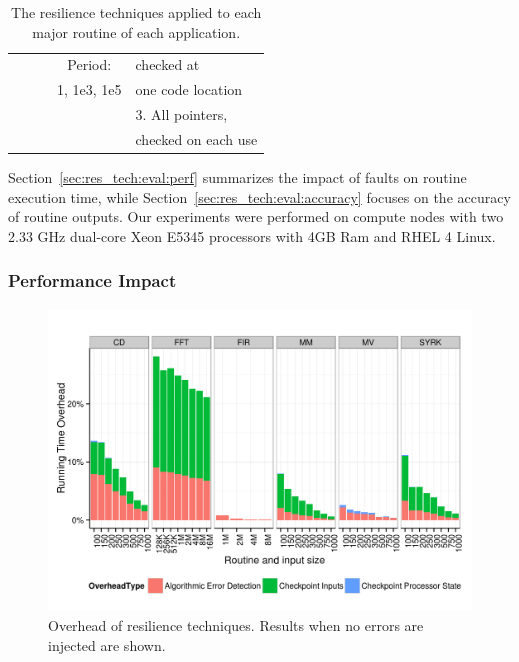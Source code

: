 \documentclass[10pt, conference, compsocconf]{IEEEtran}
\begin{document}
\begin{table}
\begin{tabular}{|c|c|c|c|c|}
                               &      &                                   & Period:        & \multicolumn{1}{|l|}{checked at}  \\
                               &      &                                   & 1, 1e3, 1e5    & \multicolumn{1}{|l|}{one code location}\\
                               &      &                                   &                & \multicolumn{1}{|l|}{3. All pointers,} \\
                               &      &                                   &                & \multicolumn{1}{|l|}{checked on each use} \\
    \hline
  \end{tabular}
  \vspace{-10pt}
  \caption{The resilience techniques applied to each major routine of each application.}
  \vspace{-15pt}
  \label{tbl:configs}
\end{table}

Section~\ref{sec:res_tech:eval:perf} summarizes the impact of faults on routine execution time, while Section~\ref{sec:res_tech:eval:accuracy} focuses on the accuracy of routine outputs.
Our experiments were performed on compute nodes with two 2.33 GHz dual-core Xeon E5345 processors with 4GB Ram and RHEL 4 Linux.

\vspace{-10pt}
\subsubsection{Performance Impact}
\vspace{-10pt}
\label{sec:res_tech:eval:perf}

\begin{figure}[ht!]
\centering
\includegraphics[width=1.00\columnwidth]{figs/4_1_1_Overall_Breakdown.png}
\caption{Overhead of resilience techniques. Results when no errors are injected are shown.}
\label{fig:routine_all_ovhd}
\end{figure}
\end{document}
